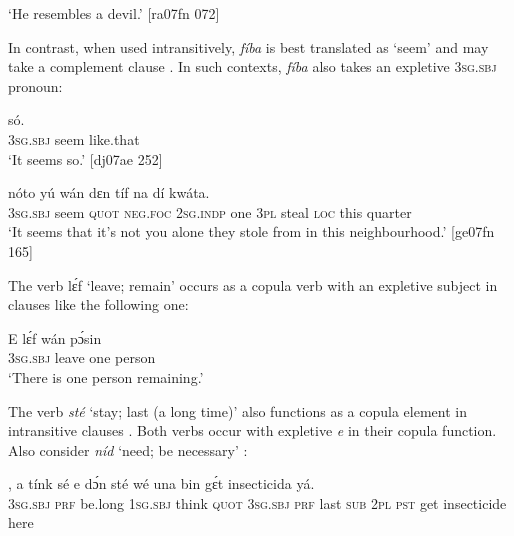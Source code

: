 \glt ‘He resembles a devil.’ [ra07fn 072]
\z

In contrast, when used intransitively, \textit{fíba} is best translated as ‘seem’  and may take a complement clause . In such contexts, \textit{fíba} also takes an expletive \textsc{3sg.sbj} pronoun:


\ea%
    \label{ex:key:1141}
    \gll {}        só.\\
\textsc{3sg.sbj}  seem  like.that\\

\glt ‘It seems so.’ [dj07ae 252]
\z


\ea%
    \label{ex:key:1142}
    \gll {}            nóto  yú    wán    dɛn  tíf
na  dí  kwáta.\\
\textsc{3sg.sbj}  seem  \textsc{quot}    \textsc{neg}.\textsc{foc}  \textsc{2sg.indp}  one    \textsc{3pl}  steal
\textsc{loc}  this  quarter\\

\glt ‘It seems that it’s not you alone they stole from in this neighbourhood.’ [ge07fn 165]
\z

The verb lɛ́f ‘leave; remain’ occurs as a copula verb with an expletive subject in clauses like the following one:


\ea%
    \label{ex:key:1143}
    \gll E    lɛ́f    wán    pɔ́sin\\
\textsc{3sg.sbj}  leave  one    person\\

\glt ‘There is one person remaining.’
\z

The verb \textit{sté} ‘stay; last (a long time)’ also functions as a copula element in intransitive clauses . Both verbs occur with expletive \textit{e} in their copula function. Also consider \textit{níd} ‘need; be necessary’ :


\ea%
    \label{ex:key:1144}
    \gll {}      ,    a    tínk    sé    e    dɔ́n  sté
wé  una  bin  gɛ́t  insecticida  yá.\\
\textsc{3sg.sbj}  \textsc{prf}  be.long  \textsc{1sg.sbj}  think  \textsc{quot}    \textsc{3sg.sbj}  \textsc{prf}  last
\textsc{sub}  \textsc{2pl}  \textsc{pst}  get  insecticide  here\\

